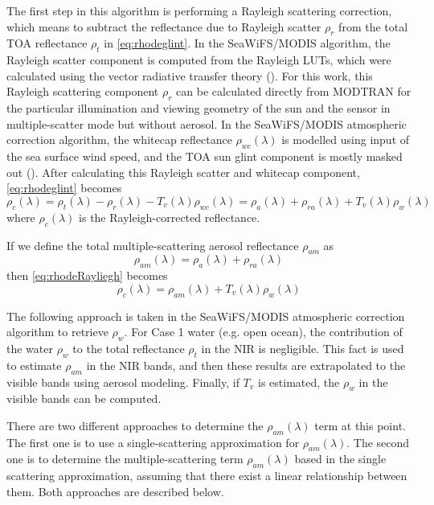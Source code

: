 The first step in this algorithm is performing a Rayleigh scattering correction, which means to subtract the reflectance due to Rayleigh scatter $\rho_r$ from the total TOA reflectance $\rho_t$ in \autoref{eq:rhodeglint}. In the SeaWiFS/MODIS algorithm, the Rayleigh scatter component is computed from the Rayleigh LUTs, which were calculated using the vector radiative transfer theory (\cite{Wang:1991,IOCCG:2010}). For this work, this Rayleigh scattering component $\rho_r$ can be calculated directly from MODTRAN for the particular illumination and viewing geometry of the sun and the sensor in multiple-scatter mode but without aerosol. In the SeaWiFS/MODIS atmospheric correction algorithm, the whitecap reflectance $\rho_{wc}(\lambda)$ is modelled using input of the sea surface wind speed, and the TOA sun glint component is mostly masked out (\cite{IOCCG:2010}). After calculating this Rayleigh scatter and whitecap component, \autoref{eq:rhodeglint} becomes 
\begin{equation}\label{eq:rhodeRayliegh}
 \rho_c(\lambda) = \rho_t(\lambda)-\rho_r(\lambda)-T_v(\lambda)\rho_{wc}(\lambda) = \rho_a(\lambda)+\rho_{ra}(\lambda)+T_v(\lambda)\rho_{w}(\lambda)
\end{equation}
where $\rho_c(\lambda)$ is the Rayleigh-corrected reflectance. 

If we define the total multiple-scattering aerosol reflectance $\rho_{am}$ as
\begin{equation}\label{eq:rhoam1}
  \rho_{am}(\lambda) = \rho_a(\lambda)+\rho_{ra}(\lambda)
\end{equation}
then \autoref{eq:rhodeRayliegh} becomes
\begin{equation}\label{eq:rhoam}
 \rho_c(\lambda) = \rho_{am}(\lambda) + T_v(\lambda)\rho_{w}(\lambda)
\end{equation}

The following approach is taken in the SeaWiFS/MODIS atmospheric correction algorithm to retrieve $\rho_w$. For Case 1 water (e.g. open ocean), the contribution of the water $\rho_{w}$ to the total reflectance $\rho_t$ in the NIR is negligible. This fact is used to estimate $\rho_{am}$ in the NIR bands, and then these results are extrapolated to the visible bands using aerosol modeling. Finally, if $T_v$ is estimated, the $\rho_w$ in the visible bands can be computed.

There are two different approaches to determine the $\rho_{am}(\lambda)$ term at this point. The first one is to use a single-scattering approximation for $\rho_{am}(\lambda)$. The second one is to determine the multiple-scattering term $\rho_{am}(\lambda)$ based in the single scattering approximation, assuming that there exist a linear relationship between them. Both approaches are described below.

